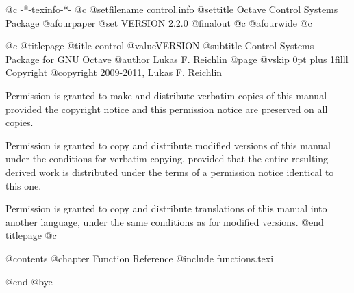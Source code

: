    @c -*-texinfo-*-
@c %
@setfilename control.info
@settitle Octave Control Systems Package
@afourpaper
@set VERSION 2.2.0
@finalout
@c @afourwide
@c %

@c %
@titlepage
@title control @value{VERSION}
@subtitle Control Systems Package for GNU Octave
@author Lukas F. Reichlin
@page
@vskip 0pt plus 1filll
Copyright @copyright{} 2009-2011, Lukas F. Reichlin

Permission is granted to make and distribute verbatim copies of
this manual provided the copyright notice and this permission notice
are preserved on all copies.

Permission is granted to copy and distribute modified versions of this
manual under the conditions for verbatim copying, provided that the entire
resulting derived work is distributed under the terms of a permission
notice identical to this one.

Permission is granted to copy and distribute translations of this manual
into another language, under the same conditions as for modified versions.
@end titlepage
@c %

@contents
@chapter Function Reference
@include functions.texi

@end
@bye
